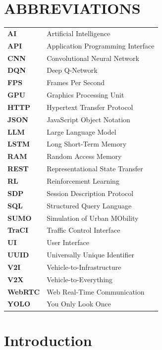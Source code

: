 \documentclass[12pt,a4paper]{report}
\begin{document}
\chapter*{ABBREVIATIONS}
\begin{flushleft}
\begin{longtable}{ll}
\textbf{AI} & Artificial Intelligence \\
\textbf{API} & Application Programming Interface \\
\textbf{CNN} & Convolutional Neural Network \\
\textbf{DQN} & Deep Q-Network \\
\textbf{FPS} & Frames Per Second \\
\textbf{GPU} & Graphics Processing Unit \\
\textbf{HTTP} & Hypertext Transfer Protocol \\
\textbf{JSON} & JavaScript Object Notation \\
\textbf{LLM} & Large Language Model \\
\textbf{LSTM} & Long Short-Term Memory \\
\textbf{RAM} & Random Access Memory \\
\textbf{REST} & Representational State Transfer \\
\textbf{RL} & Reinforcement Learning \\
\textbf{SDP} & Session Description Protocol \\
\textbf{SQL} & Structured Query Language \\
\textbf{SUMO} & Simulation of Urban MObility \\
\textbf{TraCI} & Traffic Control Interface \\
\textbf{UI} & User Interface \\
\textbf{UUID} & Universally Unique Identifier \\
\textbf{V2I} & Vehicle-to-Infrastructure \\
\textbf{V2X} & Vehicle-to-Everything \\
\textbf{WebRTC} & Web Real-Time Communication \\
\textbf{YOLO} & You Only Look Once \\
\end{longtable}
\end{flushleft}
\newpage


\chapter{Introduction}
\end{document}
